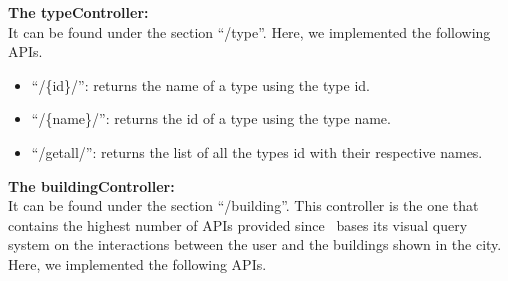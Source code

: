 {\bf The typeController:}\\
It can be found under the section ``/type''. Here, we implemented the following APIs.
\begin{itemize}
	\item ``/\{id\}/'':  returns the name of a type using the type id.
	\item ``/\{name\}/'':  returns the id of a type using the type name.
	\item ``/getall/'': returns the list of all the types id with their respective names.
\end{itemize}

{\bf The buildingController:}\\
It can be found under the section ``/building''. This controller is the one that contains the highest number of APIs provided since \applicationName\ bases its visual query system on the interactions between the user and the buildings shown in the city. Here, we implemented the following APIs.
